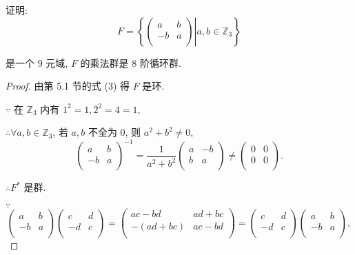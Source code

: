 \documentclass[color=black,device=normal,lang=cn,mode=geye]{elegantnote}
\begin{document}
\begin{exercise}%
    证明:
    \[F=\left\{\left.\begin{pmatrix}
        a & b \\
        -b & a \\
    \end{pmatrix}\right|a,b\in\mathbb{Z}_3\right\}\]

    是一个 $9$ 元域, $F$ 的乘法群是 $8$ 阶循环群.
\end{exercise}
\begin{proof}
    由第 5.1 节的式 (3) 得 $F$ 是环.

    $\because$ 在 $\mathbb{Z}_3$ 内有 $1^2=1,2^2=4=1$,

    $\therefore\forall a,b\in\mathbb{Z}_3$, 若 $a,b$ 不全为 $0$, 则 $a^2+b^2\neq0$,
    \[\begin{pmatrix}
        a & b \\
        -b & a \\
    \end{pmatrix}^{-1}=\dfrac{1}{a^2+b^2}\begin{pmatrix}
        a & -b \\
        b & a \\
    \end{pmatrix}\neq\begin{pmatrix}
        0 & 0 \\
        0 & 0 \\
    \end{pmatrix}.\]

    $\therefore F^*$ 是群.

    $\because$
    \[\begin{pmatrix}
        a & b \\
        -b & a \\
    \end{pmatrix}\begin{pmatrix}
        c & d \\
        -d & c \\
    \end{pmatrix}=\begin{pmatrix}
        ac-bd & ad+bc \\
        -(ad+bc) & ac-bd \\
    \end{pmatrix}=\begin{pmatrix}
        c & d \\
        -d & c \\
    \end{pmatrix}\begin{pmatrix}
        a & b \\
        -b & a \\
    \end{pmatrix},\]


\end{proof}
\end{document}
